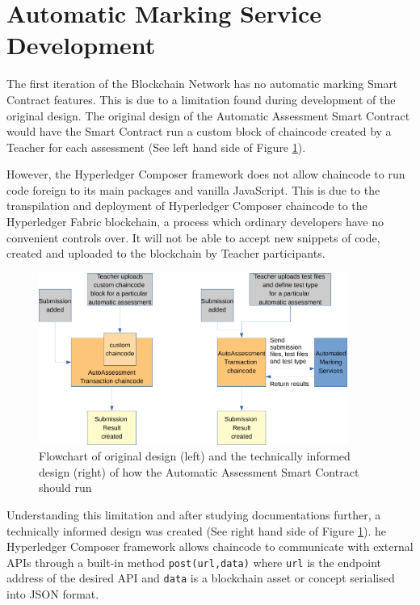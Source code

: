 \section{Automatic Marking Service Development}

The first iteration of the Blockchain Network has no automatic marking Smart Contract features.
This is due to a limitation found during development of the original design. The original design
of the Automatic Assessment Smart Contract would have the Smart Contract run a custom block of chaincode
created by a Teacher for each assessment (See left hand side of Figure \ref{fig:automarkinglim}).

However, the Hyperledger Composer framework does not allow chaincode to run code foreign to its main packages and vanilla JavaScript.
This is due to the transpilation and deployment of Hyperledger Composer chaincode to the Hyperledger Fabric blockchain,
a process which ordinary developers have no convenient controls over. It will not be able to accept new snippets of code,
created and uploaded to the blockchain by Teacher participants.

\begin{figure}[!ht]
	\centering
	\includegraphics[width=0.9\textwidth]{automarkinglim}
	\caption[AutoAssessment Smart Contract Design Change]
	{Flowchart of original design (left) and the technically informed design (right) of how the Automatic Assessment Smart Contract should run}
	\label{fig:automarkinglim}
\end{figure}

Understanding this limitation and after studying documentations further, a technically informed design was created
(See right hand side of Figure \ref{fig:automarkinglim}). he Hyperledger Composer framework allows chaincode
to communicate with external APIs through a built-in method \texttt{post(url,data)} where \texttt{url} is
the endpoint address of the desired API and \texttt{data} is a blockchain asset or concept serialised into JSON format.

